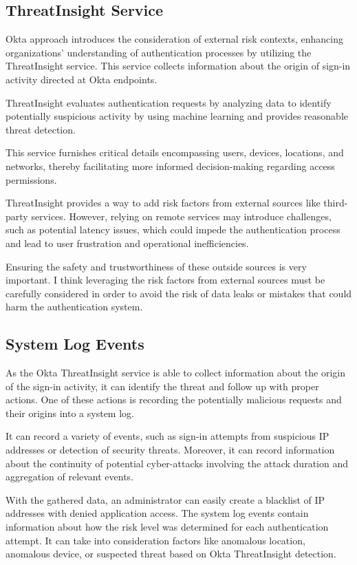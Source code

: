 \newpage
\subsection*{ThreatInsight Service}
Okta approach introduces the consideration of external risk contexts, enhancing organizations' understanding of authentication processes by utilizing the ThreatInsight service.
This service collects information about the origin of sign-in activity directed at Okta endpoints.

ThreatInsight evaluates authentication requests by analyzing data to identify potentially suspicious activity by using machine learning and provides reasonable threat detection. 

This service furnishes critical details encompassing users, devices, locations, and networks, thereby facilitating more informed decision-making regarding access permissions.

ThreatInsight provides a way to add risk factors from external sources like third-party services. However, relying on remote services may introduce challenges, such as potential latency issues, which could impede the authentication process and lead to user frustration and operational inefficiencies.\cite{existing-okta-lowrisk} \cite{existing-okta-confidence}

Ensuring the safety and trustworthiness of these outside sources is very important.
I think leveraging the risk factors from external sources must be carefully considered in order to avoid the risk of data leaks or mistakes that could harm the authentication system.

\subsection*{System Log Events}
As the Okta ThreatInsight service is able to collect information about the origin of the sign-in activity, it can identify the threat and follow up with proper actions.
One of these actions is recording the potentially malicious requests and their origins into a system log.

It can record a variety of events, such as sign-in attempts from suspicious IP addresses or detection of security threats.
Moreover, it can record information about the continuity of potential cyber-attacks involving the attack duration and aggregation of relevant events.

With the gathered data, an administrator can easily create a blacklist of IP addresses with denied application access.
The system log events contain information about how the risk level was determined for each authentication attempt.
It can take into consideration factors like anomalous location, anomalous device, or suspected threat based on Okta ThreatInsight detection.\cite{existing-okta-risk-scoring}\cite{existing-okta-syslog}

